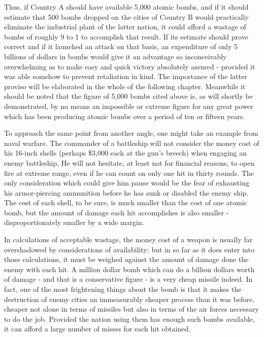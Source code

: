 Thus, if Country A should have available 5,000 atomic bombs, and if it should estimate that 500 bombs dropped on the cities of Country B would practically eliminate the industrial plant of the latter nation, it could afford a wastage of bombs of roughly 9 to 1 to accomplish that result. If its estimate should prove correct and if it launched an attack on that basis, an expenditure of only 5 billions of dollars in bombs would give it an advantage so inconceivably overwhelming as to make easy and quick victory absolutely assured - provided it was able somehow to prevent retaliation in kind. The importance of the latter proviso will be elaborated in the whole of the following chapter. Meanwhile it should be noted that the figure of 5,000 bombs cited above is, as will shortly be demonstrated, by no means an impossible or extreme figure for any great power which has been producing atomic bombs over a period of ten or fifteen years.

To approach the same point from another angle, one might take an example from naval warfare. The commander of a battleship will not consider the money cost of his 16-inch shells (perhaps \$3,000 each at the gun's breech) when engaging an enemy battleship, He will not hesitate, at least not for financial reasons, to open fire at extreme range, even if he can count on only one hit in thirty rounds. The only consideration which could give him pause would be the fear of exhausting his armor-piercing ammunition before he has sunk or disabled the enemy ship. The cost of each shell, to be sure, is much smaller than the cost of one atomic bomb, but the amount of damage each hit accomplishes is also smaller - disproportionately smaller by a wide margin.

In calculations of acceptable wastage, the money cost of a weapon is usually far overshadowed by considerations of availability; but in so far as it does enter into those calculations, it must be weighed against the amount of damage done the enemy with each hit. A million dollar bomb which can do a billion dollars worth of damage - and that is a conservative figure - is a very cheap missile indeed. In fact, one of the most frightening things about the bomb is that it makes the destruction of enemy cities an immeasurably cheaper process than it was before, cheaper not alone in terms of missiles but also in terms of the air forces necessary to do the job. Provided the nation using them has enough such bombs available, it can afford a large number of misses for each hit obtained.

